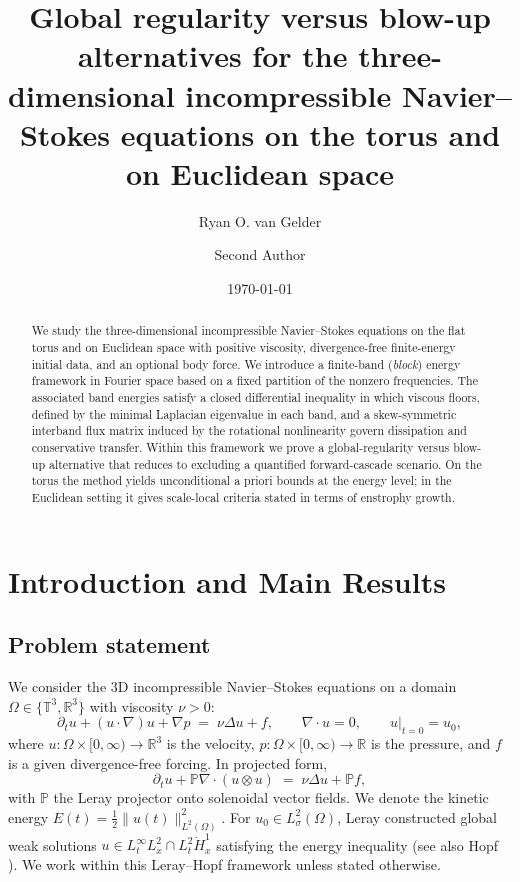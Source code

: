 \IfFileExists{nyjm.cls}{\documentclass[11pt]{nyjm}}{\documentclass[11pt]{amsart}}
\title[Global regularity vs blow-up for 3D NSE]{Global regularity versus blow-up alternatives for the three-dimensional incompressible Navier--Stokes equations on the torus and on Euclidean space}
\author[First Author]{Ryan O. van Gelder}
\author[Second Author]{Second Author}
\date{\today}
\newcommand{\R}{\mathbb{R}}
\newcommand{\T}{\mathbb{T}}
\theoremstyle{plain}
\theoremstyle{definition}
\theoremstyle{remark}
\begin{document}
\maketitle

\begin{abstract}
We study the three-dimensional incompressible Navier--Stokes equations on the flat torus and on Euclidean space with positive viscosity, divergence-free finite-energy initial data, and an optional body force. We introduce a finite-band (\emph{block}) energy framework in Fourier space based on a fixed partition of the nonzero frequencies. The associated band energies satisfy a closed differential inequality in which viscous floors, defined by the minimal Laplacian eigenvalue in each band, and a skew-symmetric interband flux matrix induced by the rotational nonlinearity govern dissipation and conservative transfer. Within this framework we prove a global-regularity versus blow-up alternative that reduces to excluding a quantified forward-cascade scenario. On the torus the method yields unconditional a priori bounds at the energy level; in the Euclidean setting it gives scale-local criteria stated in terms of enstrophy growth.
\end{abstract}

\section{Introduction and Main Results}


\subsection{Problem statement}\label{subsec:problem}
We consider the 3D incompressible Navier--Stokes equations on a domain $\Omega\in\{\T^3,\R^3\}$ with viscosity $\nu>0$:
\begin{equation}\label{eq:NSE}
\partial_t u + (u\cdot\nabla)u + \nabla p \;=\; \nu \Delta u + f,\qquad \nabla\cdot u = 0,\qquad u|_{t=0}=u_0,
\end{equation}
where $u:\Omega\times[0,\infty)\to\R^3$ is the velocity, $p:\Omega\times[0,\infty)\to\R$ is the pressure, and $f$ is a given divergence-free forcing. In projected form,
\begin{equation}\label{eq:projected}
\partial_t u + \mathbb P\nabla\!\cdot(u\otimes u) \;=\; \nu \Delta u + \mathbb P f,
\end{equation}
with $\mathbb P$ the Leray projector onto solenoidal vector fields. We denote the kinetic energy $E(t)=\tfrac12\|u(t)\|_{L^2(\Omega)}^2$. For $u_0\in L^2_\sigma(\Omega)$, Leray constructed global weak solutions $u\in L^\infty_t L^2_x\cap L^2_t \dot H^1_x$ satisfying the energy inequality \cite{Leray1934} (see also Hopf \cite{Hopf1951}). We work within this Leray--Hopf framework unless stated otherwise.
\end{document}
